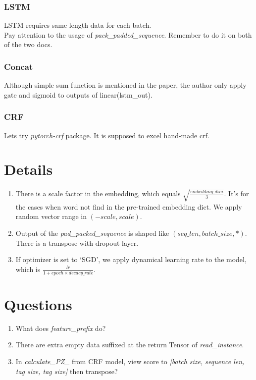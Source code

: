 \documentclass[12pt]{article}
\begin{document}
    \subsubsection{LSTM}\label{lstm}
    LSTM requires same length data for each batch.\\
    Pay attention to the usage of \emph{pack\_padded\_sequence}. Remember to do it on both of the two docs.
    \subsubsection{Concat}\label{concat}
    Although simple sum function is mentioned in the paper, the author only apply gate and sigmoid to
    outputs of linear(lstm\_out).
    \subsubsection{CRF}\label{crf}
    Lets try \emph{pytorch-crf} package. It is supposed to excel hand-made crf.
    \section{Details}
    \begin{enumerate}
        \item There is a scale factor in the embedding, which equals $\sqrt{\frac{embedding\_dim}{3}}$.
        It's for the cases when word not find in the pre-trained embedding dict. We apply random vector range in $(-scale, scale)$.
        \item Output of the \emph{pad\_packed\_sequence} is shaped like $(seq\_len, batch\_size, *)$.
        There is a transpose with dropout layer.
        \item If optimizer is set to `SGD', we apply dynamical learning rate to the model, which is $\frac{lr}{1 + epoch \times decacy\_rate}$.
    \end{enumerate}
    \section{Questions}
    \begin{enumerate}
        \item What does \emph{feature\_prefix} do?
        \item There are extra empty data suffixed at the return Tensor of \emph{read\_instance}.
        \item In \emph{calculate\_PZ\_} from CRF model, view score to \emph{[batch size, sequence len, tag size, tag size]} then transpose? 
    \end{enumerate}
\end{document}

